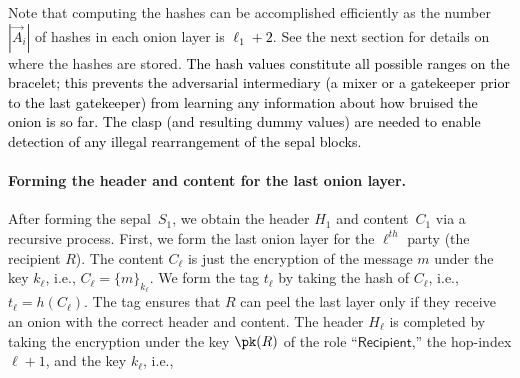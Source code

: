 \documentclass[runningheads,a4paper]{llncs}
\begin{document}
Note that computing the hashes can be accomplished efficiently as the number $|\vec{A}_i|$ of hashes in each onion layer is \textcolor{black}{$\ell_1+2$}. See the next section for details on where the hashes are stored. \textcolor{black}{The hash values constitute all possible ranges on the bracelet; this prevents the adversarial intermediary (a mixer or a gatekeeper prior to the last gatekeeper) from learning any information about how bruised the onion is so far. The clasp (and resulting dummy values) are needed to enable detection of any illegal rearrangement of the sepal blocks. }

\paragraph{Forming the header and content for the last onion layer.} 
After forming the sepal~$S_1$, we obtain the header $H_1$ and content~$C_1$ via a recursive process. First, we form the last onion layer for the $\ell^\mathit{th}$ party (the recipient $R$). 
The content $C_{\ell}$ is just the encryption of the message $m$ under the key $k_{\ell}$, i.e., $C_{\ell} = \{m\}_{k_{\ell}}$. We form the tag $t_{\ell}$ by taking the hash of $C_\ell$, i.e., $t_{\ell} = h(C_{\ell})$. 
The tag ensures that $R$ can peel the last layer only if they receive an onion with the correct header and content. 
The header $H_{\ell}$ is completed by taking the encryption  under the key $\pk(R)$ of the role ``$\mathsf{Recipient}$,'' the hop-index $\ell+1$, and 
the key $k_{\ell}$, i.e., 
\end{document}
